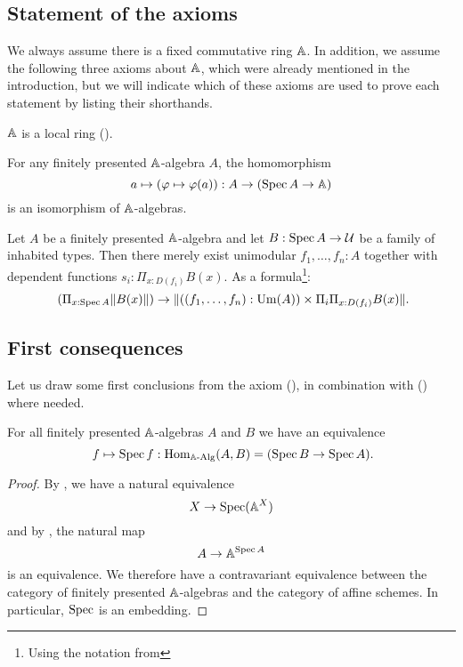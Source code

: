 \subsection{Statement of the axioms}%
\label{statement-of-axioms}

We always assume there is a fixed commutative ring $\mathbb{A}$.
In addition, we assume the following three axioms about $\mathbb{A}$,
which were already mentioned in the introduction,
but we will indicate which of these axioms are used to prove each statement
by listing their shorthands.

\begin{axiom}[Loc]%
  \label{loc}
  $\mathbb{A}$ is a local ring ().
\end{axiom}

\begin{axiom}[SQC]%
  \label{sqc}
  For any finitely presented $\mathbb{A}$-algebra $A$, the homomorphism
  \[ a \mapsto (\varphi\mapsto \varphi(a)) : A \to (\operatorname{Spec} A \to \mathbb{A})\]
  is an isomorphism of $\mathbb{A}$-algebras.
\end{axiom}

\begin{axiom}[Z-choice]%
  \label{Z-choice}
  Let $A$ be a finitely presented $\mathbb{A}$-algebra
  and let $B : \operatorname{Spec} A \to \mathcal{U}$ be a family of inhabited types.
  Then there merely exist unimodular $f_1, \dots, f_n : A$
  together with dependent functions $s_i : \Pi_{x : D(f_i)} B(x)$.
  As a formula\footnote{Using the notation from }:
  \[ (\Pi_{x : \Spec A} \propTrunc{B(x)}) \to
     \propTrunc{ ((f_1,\dots,f_n):\Um(A)) \times
      \Pi_i \Pi_{x : D(f_i)} B(x) }
     \rlap{.}
  \]
\end{axiom}

\subsection{First consequences}

Let us draw some first conclusions from the axiom (),
in combination with () where needed.

\begin{proposition}%
  \label{spec-embedding}
  For all finitely presented $\mathbb{A}$-algebras $A$ and $B$ we have an equivalence
  \[
    f\mapsto \Spec f : \Hom_{\AAlg}(A,B) = (\Spec B \to \Spec A)
    \rlap{.}
  \]
\end{proposition}

\begin{proof}
  By , we have a natural equivalence
  \[
    X\to \operatorname{Spec} (\mathbb{A}^X)
  \]
  and by , the natural map
  \[
    A\to \mathbb{A}^{\operatorname{Spec} A}
  \]
  is an equivalence.
  We therefore have a contravariant equivalence between
  the category of finitely presented $\mathbb{A}$-algebras
  and the category of affine schemes.
  In particular, $\operatorname{Spec}$ is an embedding.
\end{proof}

